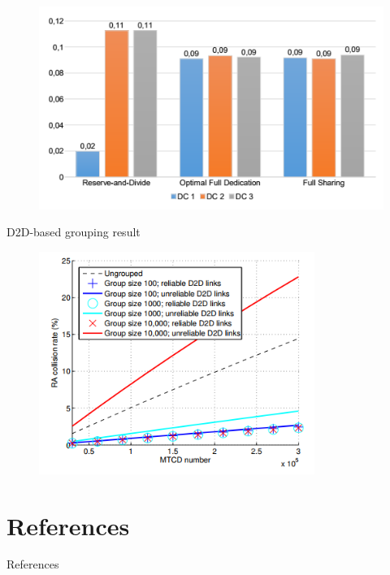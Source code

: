 \documentclass{beamer}
\begin{document}
\begin{frame}{}
    \begin{figure}[t]
    \centering
    \includegraphics[width=1\textwidth]{figures/7.png}
    \end{figure}
\end{frame}
\begin{frame}{D2D-based grouping result ~\cite{1705.02777}}
    \begin{figure}[t]
    \centering
    \includegraphics[width=0.8\textwidth]{figures/8.png}
    \end{figure}
\end{frame}
\section{}
\section{References}
\calcreferencespagetotal %
\begin{frame}[allowframebreaks]{References}
    \fontsize{9pt}{13}\selectfont
    
    
\end{frame}
\end{document}
